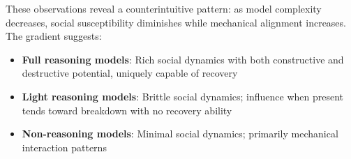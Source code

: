 \documentclass[11pt,letterpaper]{article}
\begin{document}
These observations reveal a counterintuitive pattern: as model complexity decreases, social susceptibility diminishes while mechanical alignment increases. The gradient suggests:

\begin{itemize}
    \item \textbf{Full reasoning models}: Rich social dynamics with both constructive and destructive potential, uniquely capable of recovery
    \item \textbf{Light reasoning models}: Brittle social dynamics; influence when present tends toward breakdown with no recovery ability
    \item \textbf{Non-reasoning models}: Minimal social dynamics; primarily mechanical interaction patterns
\end{itemize}
\end{document}
